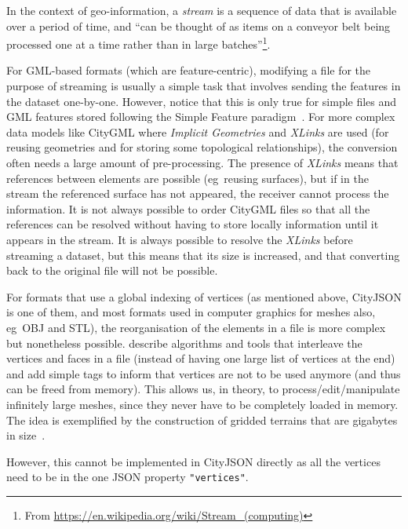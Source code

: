 \documentclass{isprs} %
\newcommand{\eg}{eg}
\begin{document}
In the context of geo-information, a \emph{stream} is a sequence of data that is available over a period of time, and ``can be thought of as items on a conveyor belt being processed one at a time rather than in large batches''\footnote{From \url{https://en.wikipedia.org/wiki/Stream_(computing)}}.

%

For GML-based formats (which are feature-centric), modifying a file for the purpose of streaming is usually a simple task that involves sending the features in the dataset one-by-one.
However, notice that this is only true for simple files and GML features stored following the Simple Feature paradigm~\citep{OGC-SF}.
For more complex data models like CityGML where \emph{Implicit Geometries} and \emph{XLinks} are used (for reusing geometries and for storing some topological relationships), the conversion often needs a large amount of pre-processing.
The presence of \emph{XLinks} means that references between elements are possible (\eg\ reusing surfaces), but if in the stream the referenced surface has not appeared, the receiver cannot process the information.
It is not always possible to order CityGML files so that all the references can be resolved without having to store locally information until it appears in the stream.
It is always possible to resolve the \emph{XLinks} before streaming a dataset, but this means that its size is increased, and that converting back to the original file will not be possible.

%

For formats that use a global indexing of vertices (as mentioned above, CityJSON is one of them, and  most formats used in computer graphics for meshes also, \eg\ OBJ and STL), the reorganisation of the elements in a file is more complex but nonetheless possible.
\citet{Isenburg03} describe algorithms and tools that interleave the vertices and faces in a file (instead of having one large list of vertices at the end) and add simple tags to inform that vertices are not to be used anymore (and thus can be freed from memory).
This allows us, in theory, to process/edit/manipulate infinitely large meshes, since they never have to be completely loaded in memory.
The idea is exemplified by the construction of gridded terrains that are gigabytes in size~\citep{Isenburg06-1}.

However, this cannot be implemented in CityJSON directly as all the vertices need to be in the one JSON property \texttt{"vertices"}.
\end{document}
